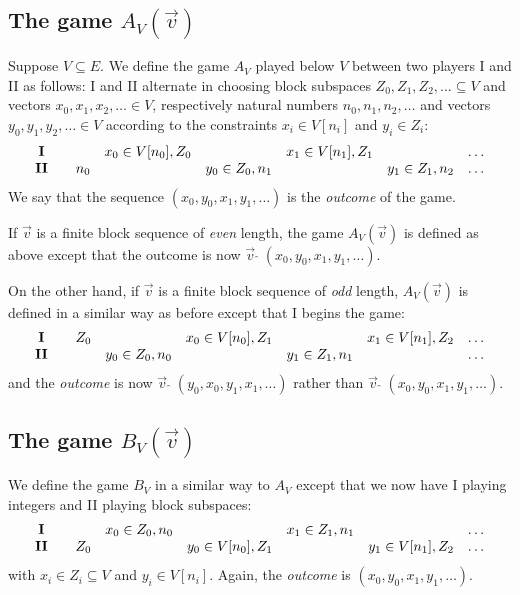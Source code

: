 \documentclass[10pt]{amsart}
\newcommand{\con}{\;\hat{}\;}
\theoremstyle{definition}
\begin{document}
\subsection*{The game $A_V(\vec v)$}
Suppose $V\subseteq E$. We define the game $A_V$ played below $V$ between two
players I and II as follows: I and II alternate  in choosing block subspaces
$Z_0,Z_1,Z_2,\ldots\subseteq V$ and vectors $x_0,x_1,x_2,\ldots\in V$,
respectively natural numbers $n_0,n_1,n_2,\ldots$ and vectors $y_0,y_1,y_2,\ldots\in
V$ according to the constraints $ x_i\in V[n_i]$ and $y_i\in Z_i$:
$$
{
\begin{array}{cccccccccccc}
{\bf I} & & &x_0\in V[n_0], Z_0 &  & x_1\in V[n_1],Z_1 &  &\ldots \\
{\bf II} & &n_0 &  & y_0\in Z_0,n_1 &  & y_1\in Z_1,n_2   &\ldots
\end{array}
}
$$
We say that the sequence $(x_0,y_0,x_1,y_1,\ldots)$ is the {\em outcome} of the
game.

If $\vec v$ is a finite block sequence of {\em even} length, the game $A_V(\vec
v)$ is defined as above except that the outcome is now $\vec v\con
(x_0,y_0,x_1,y_1,\ldots)$.


On the other hand, if $\vec v$ is a finite block sequence of {\em odd} length,
$A_V(\vec v)$ is defined in a similar way as before except that I begins the game:
$$
\begin{array}{cccccccccccc}
{\bf I} & & Z_0 &  & x_0\in V[n_0],Z_1 &  & x_1\in V[n_1],Z_2 &\ldots \\
{\bf II} &  &  & y_0\in Z_0,n_0 &  & y_1\in Z_1,n_1 &  &\ldots
\end{array}
$$
and the {\em outcome} is now $\vec v\con(y_0,x_0,y_1,x_1,\ldots)$ rather than
$\vec v\con(x_0,y_0,x_1,y_1,\ldots)$.




\subsection*{The game $B_V(\vec v)$}
We define the game $B_V$ in a similar way to $A_V$ except that we now have I
playing integers and II playing block subspaces:
$$
\begin{array}{cccccccccccc}
{\bf I} &  &  & x_0\in Z_0,n_0 &  & x_1\in Z_1,n_1 &  &\ldots       \\
{\bf II} & & Z_0 &  & y_0\in V[n_0],Z_1 &  & y_1\in V[n_1],Z_2 &\ldots
\end{array}
$$
with $x_i\in Z_i\subseteq V$ and $y_i\in V[n_i]$. Again, the {\em outcome} is
$(x_0,y_0,x_1,y_1,\ldots)$.
\end{document}
